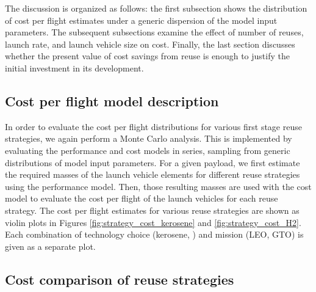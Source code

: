 \documentclass{iaf-iac}
\begin{document}
\begin{multicols}{2}
The discussion is organized as follows: the first subsection shows the distribution of cost per flight estimates under a generic dispersion of the model input parameters. The subsequent subsections examine the effect of number of reuses, launch rate, and launch vehicle size on cost. Finally, the last section discusses whether the present value of cost savings from reuse is enough to justify the initial investment in its development.

\subsection{Cost per flight model description}

In order to evaluate the cost per flight distributions for various first stage reuse strategies, we again perform a Monte Carlo analysis. This is implemented by evaluating the performance and cost models in series, sampling from generic distributions of model input parameters. For a given payload, we first estimate the required masses of the launch vehicle elements for different reuse strategies using the performance model. Then, those resulting masses are used with the cost model to evaluate the cost per flight of the launch vehicles for each reuse strategy. The cost per flight estimates for various reuse strategies are shown as violin plots in Figures \ref{fig:strategy_cost_kerosene} and \ref{fig:strategy_cost_H2}. Each combination of technology choice (kerosene, ) and mission (LEO, GTO) is given as a separate plot.

\subsection{Cost comparison of reuse strategies}


\end{multicols}
\end{document}
